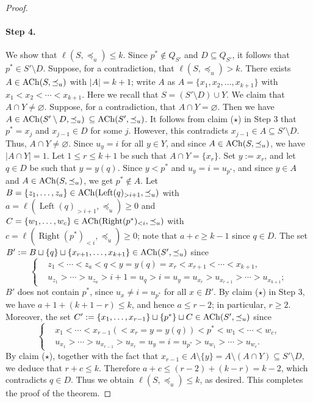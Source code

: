 \documentclass[reqno]{amsart}
\theoremstyle{definition}
\theoremstyle{remark}
\numberwithin{equation}{section}
\begin{document}
\begin{proof}
		\paragraph{\bf Step 4.}     
		We show that $\ell(S,\preceq_u)\le k$.
		Since $p^\ast\notin Q_{S'}$ and $D\subseteq Q_{S'}$, it follows that
		$p^\ast\in S'\setminus D$.
		Suppose, for a contradiction, that $\ell(S,\preceq_u)> k$.
		There exists $A\in\operatorname{ACh}(S,\preceq_u)$ with $|A|=k+1$; write $A$ as $A=\{x_1,x_2,\dots,x_{k+1}\}$ with $x_1<x_2<\cdots<x_{k+1}$.
		Here we recall that $S=(S'\setminus D)\cup Y$.
		We claim that $A\cap Y\ne\varnothing$.
		Suppose, for a contradiction, that $A\cap Y=\varnothing$.
		Then we have $A\in \operatorname{ACh}(S'\setminus D,\preceq_u)$ $\subseteq\operatorname{ACh}(S',\preceq_u)$. It follows from claim ($\star$) in Step 3 that $p^\ast=x_j$ and $x_{j-1}\in D$ for some $j$.
		However, this contradicts $x_{j-1}\in A\subseteq S'\setminus D$.
		Thus, $A\cap Y\ne\varnothing$.
		Since $u_y=i$ for all $y\in Y$,
		and since $A\in\operatorname{ACh}(S,\preceq_u)$,
		we have $|A\cap Y|=1$.
		Let $1\le r\le k+1$ be such that 
		$A\cap Y=\{x_r\}$.
		Set $y:=x_r$, and let $q\in D$ be such that $y=y(q)$.
		Since $y<p^\ast$ and $u_y=i=u_{p^\ast}$, 
		and since $y\in A$ and $A\in\operatorname{ACh}(S,\preceq_u)$,
		we get $p^\ast\notin A$.
		Let $B=\{z_1,\dots,z_a\}\in\operatorname{ACh}(\operatorname{Left}(q)_{>i+1},\preceq_u)$ with $a=\ell(\operatorname{Left}(q)_{>i+1},\preceq_u)\ge0$ and
		$C=\{w_1,\dots,w_c\}\in\operatorname{ACh}(\operatorname{Right}(p^\ast)_{<i},\preceq_u)$ with $c=\ell(\operatorname{Right}(p^\ast)_{<i},\preceq_u)\ge0$;
		note that $a+c\ge k-1$ since $q\in D$.
		The set $B':=B\sqcup\{q\}\sqcup\{x_{r+1},\dots,x_{k+1}\}\in\operatorname{ACh}(S',\preceq_u)$ since
		\[
		\left\{\begin{aligned}
			&z_1<\cdots<z_a<q<y=y(q)=x_r<x_{r+1}<\cdots<x_{k+1},\\
			&u_{z_1}>\cdots>u_{z_a}>i+1=u_q>i=u_y=u_{x_r}>u_{x_{r+1}}>\cdots>u_{x_{k+1}};\end{aligned}\right.
		\]
		$B'$ does not contain $p^\ast$, since $u_x\ne i=u_{p^\ast}$ for all $x\in B'$.
		By claim ($\star$) in Step 3,
		we have $a+1+(k+1-r)\le k$, and hence
		$a\le r-2$; in particular, $r\ge2$.
		Moreover,
		the set $C':=\{x_1,\dots,x_{r-1}\}\sqcup\{p^\ast\}\sqcup C\in\operatorname{ACh}(S',\preceq_u)$ since
		\[
		\left\{\begin{aligned}
			&x_1<\cdots<x_{r-1}(<x_r=y=y(q))<p^\ast<w_1<\cdots<w_c,\\
			&u_{x_1}>\cdots>u_{x_{r-1}}>u_{x_r}=u_y=i=u_{p^\ast}>u_{w_1}>\cdots>u_{w_c}.\end{aligned}\right.
		\]
		By claim ($\star$), together with the fact that $x_{r-1}\in A\setminus\{y\}=A\setminus(A\cap Y)\subseteq S'\setminus D$,
		we deduce that $r+c\le k$.
		Therefore $a+c\le(r-2)+(k-r)=k-2$, which contradicts $q\in D$.
		Thus we obtain $\ell(S,\preceq_u)\le k$, as desired.
		This completes the proof of the theorem.
	\end{proof}
	
\end{document}

